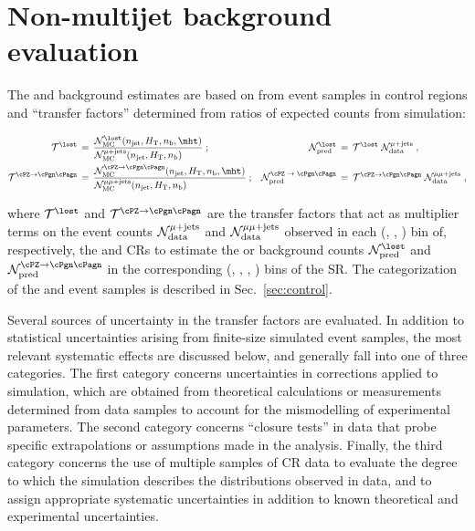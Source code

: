 
\section{Non-multijet background evaluation}
\label{sec:ewk}

The \lost and \znunuj background estimates are based on from event
samples in control regions and ``transfer factors'' determined from
ratios of expected counts from simulation:

\begin{align}
  \tf^{\lost} \, & = \,
  \frac{\mathcal{N}^{\lost}_\textrm{MC}(\njet, \scalht, \nb, \mht)}
  {\mathcal{N}^{\mj}_\textrm{MC}(\njet, \scalht, \nb)\hfill} \; ;
  & 
  \mathcal{N}^{\lost}_\textrm{pred} \, & = \,
  \tf^{\lost} \; \mathcal{N}^{\mj}_\textrm{data} \; ,
  \\
  \tf^{\znunu} \, & = \,
  \frac{\mathcal{N}^{\znunu}_\textrm{MC}(\njet, \scalht, \nb, \mht)}
  {\mathcal{N}^{\mmj}_\textrm{MC}(\njet, \scalht, \nb)\hfill} \; ;
  & 
  \mathcal{N}^\textrm{\znunu}_\textrm{pred} \, & = \,
  \tf^{\znunu} \; \mathcal{N}^{\mmj}_\textrm{data} \; ,
\end{align}

where $\tf^{\lost}$ and $\tf^{\znunu}$ are the transfer factors that
act as multiplier terms on the event counts
$\mathcal{N}^{\mu + \text{jets}}_\textrm{data}$ and
$\mathcal{N}^{\mu\mu + \text{jets}}_\textrm{data}$ observed in each (\njet, \scalht,
\nb) bin of, respectively, the \mj and \mmj CRs to estimate the \lost
or \znunuj background counts $\mathcal{N}^{\lost}_\textrm{pred}$ and
$\mathcal{N}^{\znunu}_\textrm{pred}$ in the corresponding (\njet,
\scalht, \nb, \mht) bins of the SR. The categorization of the \mj and
\mmj event samples is described in Sec.~\ref{sec:control}. 

Several sources of uncertainty in the transfer factors are evaluated.
In addition to statistical uncertainties arising from finite-size
simulated event samples, the most relevant systematic effects are
discussed below, and generally fall into one of three categories. The
first category concerns uncertainties in corrections applied to
simulation, which are obtained from theoretical calculations or
measurements determined from data samples to account for the
mismodelling of experimental parameters. The second category concerns
``closure tests'' in data that probe specific extrapolations or
assumptions made in the analysis. Finally, the third category concerns
the use of multiple samples of CR data to evaluate the degree to which
the simulation describes the \mht distributions observed in data, and
to assign appropriate systematic uncertainties in addition to known
theoretical and experimental uncertainties.

